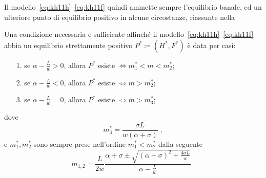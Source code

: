 Il modello~\eqref{eq:kh11h}--\eqref{eq:kh11f} quindi ammette sempre l'equilibrio banale, ed un ulteriore
punto di equilibrio positivo in alcune circostanze, riassunte nella
\begin{proposizione}
    Una condizione necessaria e sufficiente affinché il modello~\eqref{eq:kh11h}--\eqref{eq:kh11f} abbia
    un equilibrio strettamente positivo $P^* \coloneq (H^*, F^*)$ è data per casi:
    \begin{itemize}
        \item[1.] se $\alpha - \frac{L}{w} >0$, allora $P^*$ esiste $\iff m_1^* < m < m_2^*$;
        \item[2.] se $\alpha - \frac{L}{w} <0$, allora $P^*$ esiste $\iff m > m_2^*$;
        \item[3.] se $\alpha - \frac{L}{w} =0$, allora $P^*$ esiste $\iff m > m_3^*$;
    \end{itemize}
    dove
    \begin{equation}
        m_3^* = \frac{ \sigma L}{ w (\alpha + \sigma) } \; ,
        \label{eq:FstarPosM3}
    \end{equation}
    e $m_1^*, m_2^*$ sono sempre prese nell'ordine $m_1^* < m_2^*$ dalla seguente
    \begin{equation}
        m_{1,2} = \frac{L}{2w} \frac{ \alpha + \sigma \pm \sqrt{ {(\alpha - \sigma)}^2 +\frac{4 \sigma L}{w}  } }
        {\alpha -\frac{L}{w}} \; .
        \label{eq:FstarPosM12}
    \end{equation}

    \label{teo:esistenzPosF} %
\end{proposizione}


